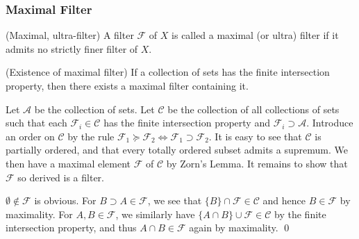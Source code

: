 \documentclass{report}
\begin{document}
\subsubsection{Maximal Filter}

\begin{dfn} (Maximal, ultra-filter)
    A filter \( \mathscr{F} \) of \( X \) is called a maximal (or ultra) filter if it admits no strictly finer filter of \( X \).
\end{dfn}

\begin{prp}\label{existence maximal filter} (Existence of maximal filter)
    If a collection of sets has the finite intersection property, then there exists a maximal filter containing it.
\end{prp}
\begin{prf}
    Let \( \mathscr{A} \) be the collection of sets.
    Let \( \mathscr{C} \) be the collection of all collections of sets such that each \( \mathscr{F}_i \in \mathscr{C} \) has the finite intersection property and \( \mathscr{F}_i \supset \mathscr{A} \). Introduce an order on \( \mathscr{C} \) by the rule \( \mathscr{F}_1 \succeq \mathscr{F}_2 \iff \mathscr{F}_1 \supset \mathscr{F}_2\).
    It is easy to see that \( \mathscr{C} \) is partially ordered, and that every totally ordered subset admits a supremum. We then have a maximal element \( \mathscr{F} \) of \( \mathscr{C} \) by Zorn's Lemma.
    It remains to show that \( \mathscr{F} \) so derived is a filter.

    \( \emptyset \notin \mathscr{F} \) is obvious.
    For \( B \supset A \in \mathscr{F} \), we see that \( \{B\}\cap \mathscr{F} \in \mathscr{C} \) and hence \( B \in \mathscr{F} \) by maximality.
    For \( A, B \in \mathscr{F} \), we similarly have \( \{A \cap B\} \cup \mathscr{F} \in \mathscr{C} \) by the finite intersection property, and thus \( A \cap B \in \mathscr{F} \) again by maximality.
    \qed\end{prf}

\end{document}
